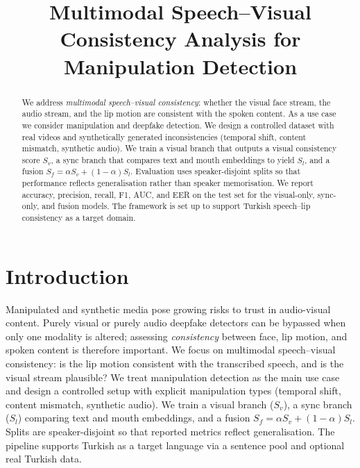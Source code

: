 \documentclass{article}
\title{Multimodal Speech--Visual Consistency Analysis for Manipulation Detection}
\author{}
\date{}
\begin{document}
\maketitle

\begin{abstract}
We address \emph{multimodal speech--visual consistency}: whether the visual face stream, the audio stream, and the lip motion are consistent with the spoken content. As a use case we consider manipulation and deepfake detection. We design a controlled dataset with real videos and synthetically generated inconsistencies (temporal shift, content mismatch, synthetic audio). We train a visual branch that outputs a visual consistency score $S_v$, a sync branch that compares text and mouth embeddings to yield $S_l$, and a fusion $S_f = \alpha S_v + (1-\alpha) S_l$. Evaluation uses speaker-disjoint splits so that performance reflects generalisation rather than speaker memorisation. We report accuracy, precision, recall, F1, AUC, and EER on the test set for the visual-only, sync-only, and fusion models. The framework is set up to support Turkish speech--lip consistency as a target domain.
\end{abstract}

\section{Introduction}
Manipulated and synthetic media pose growing risks to trust in audio-visual content. Purely visual or purely audio deepfake detectors can be bypassed when only one modality is altered; assessing \emph{consistency} between face, lip motion, and spoken content is therefore important. We focus on multimodal speech--visual consistency: is the lip motion consistent with the transcribed speech, and is the visual stream plausible? We treat manipulation detection as the main use case and design a controlled setup with explicit manipulation types (temporal shift, content mismatch, synthetic audio). We train a visual branch ($S_v$), a sync branch ($S_l$) comparing text and mouth embeddings, and a fusion $S_f = \alpha S_v + (1-\alpha) S_l$. Splits are speaker-disjoint so that reported metrics reflect generalisation. The pipeline supports Turkish as a target language via a sentence pool and optional real Turkish data.
\end{document}
